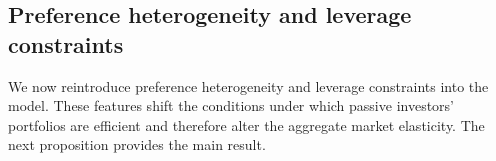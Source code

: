 \subsection{Preference heterogeneity and leverage constraints}

We now reintroduce preference heterogeneity and leverage constraints into the model. These features shift the conditions under which passive investors’ portfolios are efficient and therefore alter the aggregate market elasticity. The next proposition provides the main result.

